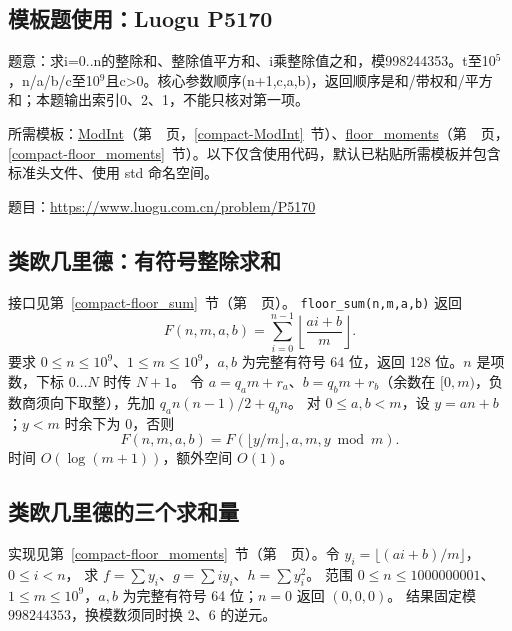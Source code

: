 

\Needspace{321pt}

\subsection*{模板题使用：Luogu P5170}

\label{usage-example-157}

题意：求i=0..n的整除和、整除值平方和、i乘整除值之和，模998244353。t至10$^{5}$，n/a/b/c至10$^{9}$且c>0。核心参数顺序(n+1,c,a,b)，返回顺序是和/带权和/平方和；本题输出索引0、2、1，不能只核对第一项。

所需模板：\hyperref[compact-ModInt]{ModInt}（第~\pageref{compact-ModInt}~页，\ref{compact-ModInt}~节）、\hyperref[compact-floor_moments]{floor\_\allowbreak{}moments}（第~\pageref{compact-floor_moments}~页，\ref{compact-floor_moments}~节）。以下仅含使用代码，默认已粘贴所需模板并包含标准头文件、使用 std 命名空间。

题目：\url{https://www.luogu.com.cn/problem/P5170}



\newpage

\subsection{类欧几里德：有符号整除求和}\label{knowledge-floor-sum}
接口见第~\ref{compact-floor_sum}~节（第~\pageref{compact-floor_sum}~页）。
\texttt{floor\_sum(n,m,a,b)} 返回
\[
F(n,m,a,b)=\sum_{i=0}^{n-1}\left\lfloor\frac{ai+b}{m}\right\rfloor.
\]
要求 $0\le n\le10^9$、$1\le m\le10^9$，$a,b$ 为完整有符号 64 位，返回 128 位。$n$ 是项数，下标 $0\ldots N$ 时传 $N+1$。
令 $a=q_am+r_a$、$b=q_bm+r_b$（余数在 $[0,m)$，负数商须向下取整），先加 $q_an(n-1)/2+q_bn$。
对 $0\le a,b<m$，设 $y=an+b$；$y<m$ 时余下为 0，否则
\[
F(n,m,a,b)=F(\lfloor y/m\rfloor,a,m,y\bmod m).
\]
时间 $O(\log(m+1))$，额外空间 $O(1)$。



\newpage

\subsection{类欧几里德的三个求和量}\label{knowledge-floor-moments}
实现见第~\ref{compact-floor_moments}~节（第~\pageref{compact-floor_moments}~页）。令 $y_i=\lfloor(ai+b)/m\rfloor$，$0\le i<n$，
求 $f=\sum y_i$、$g=\sum i y_i$、$h=\sum y_i^2$。
范围 $0\le n\le1000000001$、$1\le m\le10^9$，$a,b$ 为完整有符号 64 位；$n=0$ 返回 $(0,0,0)$。
结果固定模 $998244353$，换模数须同时换 2、6 的逆元。

